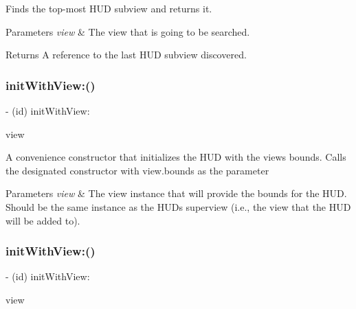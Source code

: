 Finds the top-\/most H\+UD subview and returns it.


\begin{DoxyParams}{Parameters}
{\em view} & The view that is going to be searched. \\
\hline
\end{DoxyParams}
\begin{DoxyReturn}{Returns}
A reference to the last H\+UD subview discovered. 
\end{DoxyReturn}
\mbox{\label{interface_m_b_progress_h_u_d_ae42ee0d2d0ea58fac1ce8de6b5ea3b60}} 
\subsubsection{\texorpdfstring{init\+With\+View\+:()}{initWithView:()}\hspace{0.1cm}{\footnotesize\ttfamily [1/3]}}
{\footnotesize\ttfamily -\/ (id) init\+With\+View\+: \begin{DoxyParamCaption}\item[{(U\+I\+View $\ast$)}]{view }\end{DoxyParamCaption}}

A convenience constructor that initializes the H\+UD with the view\textquotesingle{}s bounds. Calls the designated constructor with view.\+bounds as the parameter


\begin{DoxyParams}{Parameters}
{\em view} & The view instance that will provide the bounds for the H\+UD. Should be the same instance as the H\+UD\textquotesingle{}s superview (i.\+e., the view that the H\+UD will be added to). \\
\hline
\end{DoxyParams}
\mbox{\label{interface_m_b_progress_h_u_d_ae42ee0d2d0ea58fac1ce8de6b5ea3b60}} 
\subsubsection{\texorpdfstring{init\+With\+View\+:()}{initWithView:()}\hspace{0.1cm}{\footnotesize\ttfamily [2/3]}}
{\footnotesize\ttfamily -\/ (id) init\+With\+View\+: \begin{DoxyParamCaption}\item[{(U\+I\+View $\ast$)}]{view }\end{DoxyParamCaption}}

